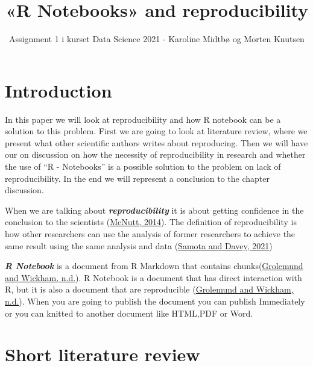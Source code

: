 \documentclass[
  12pt,
]{article}
\title{«R Notebooks» and reproducibility}
\author{Assignment 1 i kurset Data Science 2021 - Karoline Midtbø og
Morten Knutsen}
\date{}
\begin{document}
\maketitle

\hypertarget{introduction}{%
\section{Introduction}\label{introduction}}

In this paper we will look at reproducibility and how R notebook can be
a solution to this problem. First we are going to look at literature
review, where we present what other scientific authors writes about
reproducing. Then we will have our on discussion on how the necessity of
reproducibility in research and whether the use of ``R - Notebooks'' is
a possible solution to the problem on lack of reproducibility. In the
end we will represent a conclusion to the chapter discussion.

When we are talking about \textbf{\emph{reproducibility}} it is about
getting confidence in the conclusion to the scientists
(\protect\hyperlink{ref-mcnutt2014}{McNutt, 2014}). The definition of
reproducibility is how other researchers can use the analysis of former
researchers to achieve the same result using the same analysis and data
(\protect\hyperlink{ref-samota2021}{Samota and Davey, 2021})

\textbf{\emph{R Notebook}} is a document from R Markdown that contains
chunks(\protect\hyperlink{ref-grolemund}{Grolemund and Wickham, n.d.}).
R Notebook is a document that has direct interaction with R, but it is
also a document that are reproducible
(\protect\hyperlink{ref-grolemund}{Grolemund and Wickham, n.d.}). When
you are going to publish the document you can publish Immediately or you
can knitted to another document like HTML,PDF or Word.

\hypertarget{short-literature-review}{%
\section{Short literature review}\label{short-literature-review}}
\end{document}
